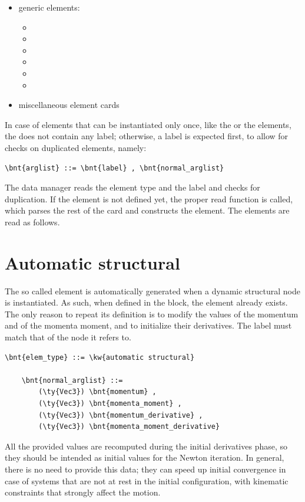 \begin{itemize}
\item generic elements:
\begin{itemize}
\item {}
\item {}
\item {}
\item {}
\item {}
\item {}
\end{itemize}

\item miscellaneous element cards
\end{itemize}


In case of elements that can be instantiated only once, like
the  or the  elements, the 
does not contain any label; otherwise, a label is expected first, to allow 
for checks on duplicated elements, namely: 
\begin{Verbatim}[commandchars=\\\{\}]
    \bnt{arglist} ::= \bnt{label} , \bnt{normal_arglist}
\end{Verbatim}
The data manager reads the element type and the label and checks for
duplication. If the element is not defined yet, the proper read function is
called, which parses the rest of the card and constructs the element.
The elements are read as follows.







\section{Automatic structural}
The so called  element is automatically generated
when a dynamic structural node is instantiated.
As such, when defined in the  block,
the element already exists.
The only reason to repeat its definition is to modify the values
of the momentum and of the momenta moment, and to initialize
their derivatives.
The label must match that of the node it refers to.
\begin{Verbatim}[commandchars=\\\{\}]
    \bnt{elem_type} ::= \kw{automatic structural}

    \bnt{normal_arglist} ::=
        (\ty{Vec3}) \bnt{momentum} ,
        (\ty{Vec3}) \bnt{momenta_moment} ,
        (\ty{Vec3}) \bnt{momentum_derivative} ,
        (\ty{Vec3}) \bnt{momenta_moment_derivative}
\end{Verbatim}
All the provided values are recomputed during the initial derivatives phase,
so they should be intended as initial values for the Newton iteration.
In general, there is no need to provide this data; they can speed up
initial convergence in case of systems that are not at rest in the initial
configuration, with kinematic constraints that strongly affect
the motion.

